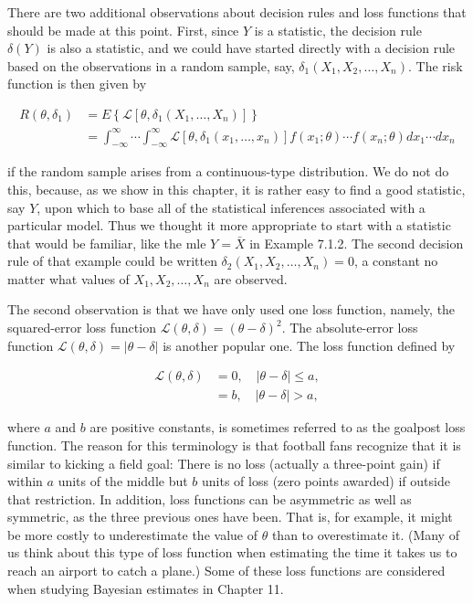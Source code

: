 There are two additional observations about decision rules and loss functions that should be made at this point. First, since $Y$ is a statistic, the decision rule\\
$\delta(Y)$ is also a statistic, and we could have started directly with a decision rule based on the observations in a random sample, say, $\delta_{1}\left(X_{1}, X_{2}, \ldots, X_{n}\right)$. The risk function is then given by

$$
\begin{aligned}
R\left(\theta, \delta_{1}\right) & =E\left\{\mathcal{L}\left[\theta, \delta_{1}\left(X_{1}, \ldots, X_{n}\right)\right]\right\} \\
& =\int_{-\infty}^{\infty} \cdots \int_{-\infty}^{\infty} \mathcal{L}\left[\theta, \delta_{1}\left(x_{1}, \ldots, x_{n}\right)\right] f\left(x_{1} ; \theta\right) \cdots f\left(x_{n} ; \theta\right) d x_{1} \cdots d x_{n}
\end{aligned}
$$

if the random sample arises from a continuous-type distribution. We do not do this, because, as we show in this chapter, it is rather easy to find a good statistic, say $Y$, upon which to base all of the statistical inferences associated with a particular model. Thus we thought it more appropriate to start with a statistic that would be familiar, like the mle $Y=\bar{X}$ in Example 7.1.2. The second decision rule of that example could be written $\delta_{2}\left(X_{1}, X_{2}, \ldots, X_{n}\right)=0$, a constant no matter what values of $X_{1}, X_{2}, \ldots, X_{n}$ are observed.

The second observation is that we have only used one loss function, namely, the squared-error loss function $\mathcal{L}(\theta, \delta)=(\theta-\delta)^{2}$. The absolute-error loss function $\mathcal{L}(\theta, \delta)=|\theta-\delta|$ is another popular one. The loss function defined by

$$
\begin{aligned}
\mathcal{L}(\theta, \delta) & =0, \quad|\theta-\delta| \leq a, \\
& =b, \quad|\theta-\delta|>a,
\end{aligned}
$$

where $a$ and $b$ are positive constants, is sometimes referred to as the goalpost loss function. The reason for this terminology is that football fans recognize that it is similar to kicking a field goal: There is no loss (actually a three-point gain) if within $a$ units of the middle but $b$ units of loss (zero points awarded) if outside that restriction. In addition, loss functions can be asymmetric as well as symmetric, as the three previous ones have been. That is, for example, it might be more costly to underestimate the value of $\theta$ than to overestimate it. (Many of us think about this type of loss function when estimating the time it takes us to reach an airport to catch a plane.) Some of these loss functions are considered when studying Bayesian estimates in Chapter 11.

